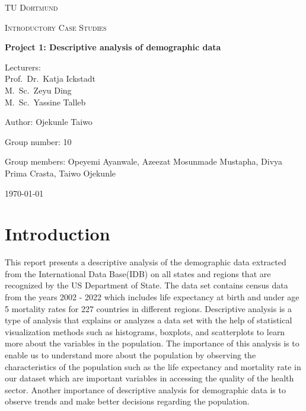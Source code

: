 \documentclass[12 pt]{scrartcl}
\begin{document}
\begin{titlepage}
	\centering
	{\scshape\LARGE TU Dortmund \par}
	\vspace{1cm}
	{\scshape\Large Introductory Case Studies \par}
	\vspace{2cm}
	{\huge\bfseries Project {1}: {Descriptive analysis of demographic data}\par}
	\vspace{2cm}
	{\Large Lecturers:\\
		Prof.\ Dr.\ Katja Ickstadt\\
		M.\ Sc.\ Zeyu Ding\\
		M.\ Sc.\ Yassine Talleb \par}
	\vspace{1cm}
	{\Large Author: {Ojekunle Taiwo} \par}
	\vspace{0.5 cm}
	{\Large Group number: {10}\par}
	\vspace{0.5 cm}
	{\Large Group members: {Opeyemi Ayanwale, Azeezat Mosunmade Mustapha, Divya Prima Crasta, Taiwo Ojekunle}}
	\vfill
	{\large \today\par}
\end{titlepage}



\tableofcontents
\thispagestyle{empty}

\cleardoublepage

\setcounter{page}{1}

\section{Introduction}

This report presents a descriptive analysis of the demographic data extracted from the International Data Base(IDB) on all states and regions that are recognized by the US Department of State. The data set contains census data from the years 2002 - 2022 which includes life expectancy at birth and under age 5 mortality rates for 227 countries in different regions. Descriptive analysis is a type of analysis that explains or analyzes a data set with the help of statistical visualization methods such as histograms, boxplots, and scatterplots to learn more about the variables in the population. The importance of this analysis is to enable us to understand more about the population by observing the characteristics of the population such as the life expectancy and mortality rate in our dataset which are important variables in accessing the quality of the health sector. Another importance of descriptive analysis for demographic data is to observe trends and make better decisions regarding the population.
\end{document}
